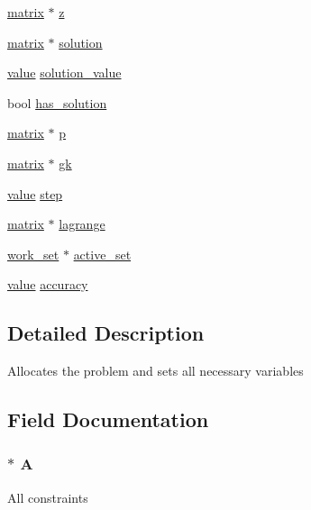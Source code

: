 \begin{DoxyCompactItemize}
\item 
\hyperlink{structmatrix}{matrix} $\ast$ \hyperlink{structproblem_a840058b5c67561185c94da497d0d3da6}{z}
\item 
\hyperlink{structmatrix}{matrix} $\ast$ \hyperlink{structproblem_a70626c7db657c601438f867391005721}{solution}
\item 
\hyperlink{mat_lib_8h_a24f54d55d636a8405ad2cf062c3c9bee}{value} \hyperlink{structproblem_a6fcb6ec86b1ba65bd2a34e9a9731c452}{solution\+\_\+value}
\item 
bool \hyperlink{structproblem_af593a3f5fcf12e8513374bc6475a53d4}{has\+\_\+solution}
\item 
\hyperlink{structmatrix}{matrix} $\ast$ \hyperlink{structproblem_a0b8e7c785036ef0cb64a801257094918}{p}
\item 
\hyperlink{structmatrix}{matrix} $\ast$ \hyperlink{structproblem_abfbecabeb3ffaa60557898d366c79c35}{gk}
\item 
\hyperlink{mat_lib_8h_a24f54d55d636a8405ad2cf062c3c9bee}{value} \hyperlink{structproblem_a9c398bc1d126ef3a4cf1efdc9d9f7423}{step}
\item 
\hyperlink{structmatrix}{matrix} $\ast$ \hyperlink{structproblem_a988084bf1423637718de8882244149f4}{lagrange}
\item 
\hyperlink{structwork__set}{work\+\_\+set} $\ast$ \hyperlink{structproblem_a27b8b36dc36cb3620e52c6275d0bb87b}{active\+\_\+set}
\item 
\hyperlink{mat_lib_8h_a24f54d55d636a8405ad2cf062c3c9bee}{value} \hyperlink{structproblem_abb02aa4aa436e037d8c806b2364cf97c}{accuracy}
\end{DoxyCompactItemize}


\subsection{Detailed Description}
Allocates the problem and sets all necessary variables 

\subsection{Field Documentation}
\hypertarget{structproblem_ac56453eb618f2ce98f20d91442a5690b}{}
\subsubsection[{A}]{$\ast$ A}\label{structproblem_ac56453eb618f2ce98f20d91442a5690b}
All constraints \hypertarget{structproblem_abb02aa4aa436e037d8c806b2364cf97c}{}
